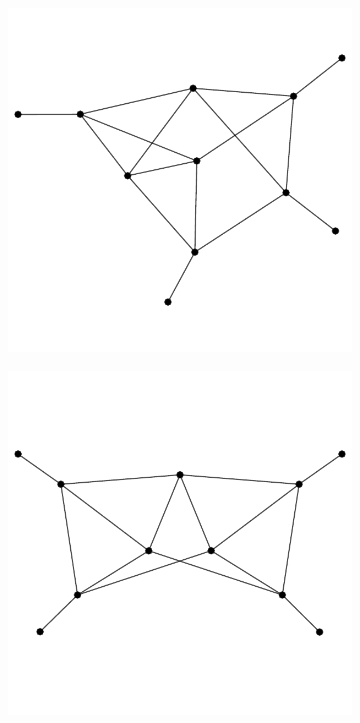 \documentclass[12pt,a4paper]{article}
\renewcommand{\|}{\rule[-0.4ex]{0.2ex}{1.2em}}
\begin{document}
\begin{figure}[htb]
\begin{subfigure}[b]{.24 \textwidth}
		\subcaption{}
	\end{subfigure}
	\begin{subfigure}[b]{.24 \textwidth}
		\includegraphics[width=\linewidth]{graph_dec2}
		\subcaption{}
	\end{subfigure}
	\begin{subfigure}[b]{.24 \textwidth}
		\includegraphics[width=\linewidth]{graph_dec3}
		\subcaption{}
	\end{subfigure}
	

\end{figure}
\end{document}
